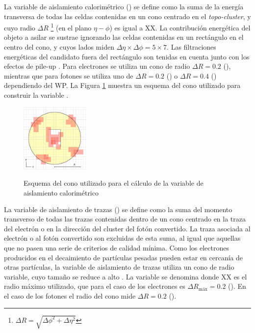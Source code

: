 La variable de aislamiento calorimétrico \cite{PERF-2017-01} () se define como la suma de la energía transversa de todas las celdas contenidas en un cono centrado en el \textit{topo-cluster}, y cuyo radio $\Delta R$ \footnote{$\Delta R=\sqrt{\Delta\phi^2+\Delta\eta^2}$} (en el plano $\eta-\phi$) es igual a XX. La contribución energética del objeto a asilar se sustrae ignorando las celdas contenidas en un rectángulo en el centro del cono, y cuyos lados miden $\Delta\eta\times\Delta\phi = 5 \times 7$. Las filtraciones energéticas del candidato fuera del rectángulo son tenidas en cuenta junto con los efectos de pile-up \cite{Cacciari}. Para electrones se utiliza un cono de radio $\Delta R = 0.2$ (), mientras que para fotones se utiliza uno de $\Delta R = 0.2$ () o $\Delta R = 0.4$ () dependiendo del WP. La Figura \ref{IDcone} muestra un esquema del cono utilizado para construir la variable .


\begin{figure}
\centering
\caption{Esquema del cono utilizado para el cálculo de la variable de aislamiento calorimétrico}
  \includegraphics[width=0.3\textwidth]{images/iso.pdf}
  \label{IDcone}
\end{figure}


La variable de aislamiento de trazas () se define como la suma del momento transverso de todas las trazas contenidas dentro de un cono centrado en la traza del electrón o en la dirección del cluster del fotón convertido. La traza asociada al electrón o al fotón convertido son excluidas de esta suma, al igual que aquellas que no pasen una serie de criterios de calidad mínima. Como los electrones producidos en el decaimiento de partículas pesadas pueden estar en cercanía de otras partículas, la variable de aislamiento de trazas utiliza un cono de radio variable, cuyo tamaño se reduce a alto \pt. La variable se denomina  donde XX es el radio máximo utilizado, que para el caso de los electrones es $\Delta R_{\text{máx}} = 0.2$ (). En el caso de los fotones el radio del cono mide $\Delta R = 0.2$ ().

